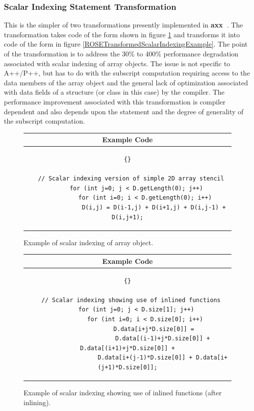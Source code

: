 \documentclass[10pt]{article}
\newcommand{\axx}{{\bf axx\ }}
\begin{document}
\subsubsection{Scalar Indexing Statement Transformation}

   This is the simpler of two transformations presently implemented in \axx.  The transformation
takes code of the form shown in figure \ref{UnoptimizedScalarIndexingExample} and transforms it into
code of the form in figure \ref{ROSETransformedScalarIndexingExample}.  The point of the
transformation is to address the 30\% to 400\% performance degradation associated with scalar
indexing of array objects.  The issue is not specific to A++/P++, but has to do with the subscript
computation requiring access to the data members of the array object and the general lack of
optimization associated with data fields of a structure (or class in this case) by the compiler.
The performance improvement associated with this transformation is compiler dependent and also
depends upon the statement and the degree of generality of the subscript computation.

\begin{figure}[h]
\begin{center}
\begin{tabular}{|c|} \hline
 Example Code \\\hline\hline
\begin{lstlisting}{}

  // Scalar indexing version of simple 2D array stencil
     for (int j=0; j < D.getLength(0); j++)
          for (int i=0; i < D.getLength(0); i++)
               D(i,j) = D(i-1,j) + D(i+1,j) + D(i,j-1) + D(i,j+1);

\end{lstlisting}
\\\hline
\end{tabular}
\end{center}
\caption{ Example of scalar indexing of array object. }
\label{UnoptimizedScalarIndexingExample}
\end{figure}


\begin{figure}[h]
\begin{center}
\begin{tabular}{|c|} \hline
 Example Code \\\hline\hline
\begin{lstlisting}{}

  // Scalar indexing showing use of inlined functions
     for (int j=0; j < D.size[1]; j++)
          for (int i=0; i < D.size[0]; i++)
               D.data[i+j*D.size[0]] =
                    D.data[(i-1)+j*D.size[0]] + D.data[(i+1)+j*D.size[0]] +
                    D.data[i+(j-1)*D.size[0]] + D.data[i+(j+1)*D.size[0]];

\end{lstlisting}
\\\hline
\end{tabular}
\end{center}
\caption{ Example of scalar indexing showing use of inlined functions (after inlining). }
\label{InlinedScalarIndexingExample}
\end{figure}
\end{document}
